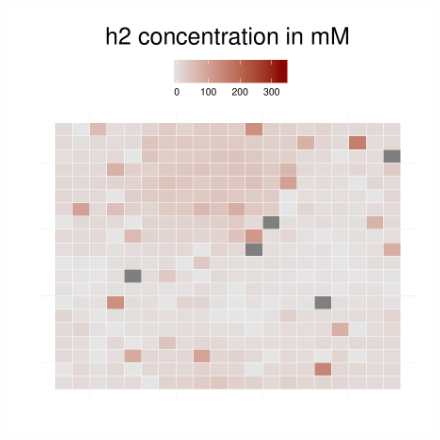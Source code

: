 \begin{figure}[h!]
{\begin{minipage}[t]{0.3\textwidth}
  \end{minipage}
  \begin{minipage}[t]{0.3\textwidth}
    \includegraphics[width=\textwidth]{../results/barkeri_beijerinckii_20x20_seed6764_h2150a.pdf}
  \end{minipage}
  }
\end{figure}

